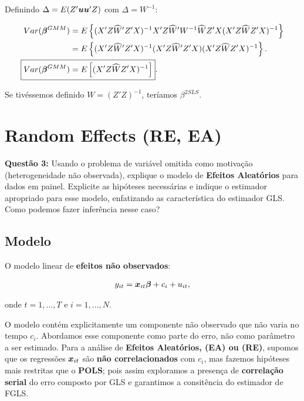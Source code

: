 \documentclass[11pt,oneside,a4paper]{article}
\numberwithin{equation}{section}
\begin{document}
\noindent
Definindo $\Delta = E(Z' \boldsymbol{u}\boldsymbol{u}' Z)$ com $\Delta = W^{-1}$:

\vspace{-1 em}
\begin{align*}
Var( \mbs{\beta}^{GMM} ) &=
E \left\{ 
( X' Z \widehat{W}' Z' X )^{-1}
X' Z \widehat{W}' W^{-1} \widehat{W} Z' X 
( X' Z \widehat{W} Z' X )^{-1}
\right\}
\\ &=
E \left\{ 
( X' Z \widehat{W}' Z' X )^{-1}
( X' Z \widehat{W}' Z' X )
( X' Z \widehat{W} Z' X )^{-1}
\right\}.
\\
\Aboxed{
Var( \mbs{\beta}^{GMM} ) &=
E \left[
( X' Z \widehat{W} Z' X )^{-1}
\right] }.
\end{align*}

\noindent
Se tivéssemos definido $W = (Z'Z)^{-1}$, teríamos $\beta^{2SLS}$.

\clearpage
\section{Random Effects (RE, EA)}

\noindent
\textbf{Questão 3:}
Usando o problema de variável omitida como motivação (heterogeneidade não observada), explique o modelo de \textbf{Efeitos Aleatórios} para dados em painel.
Explicite as hipóteses necessárias e indique o estimador apropriado para esse modelo, enfatizando as característica do estimador GLS.
Como podemos fazer inferência nesse caso?

\subsection*{Modelo}

O modelo linear de \textbf{efeitos não observados}:

\vspace{-1 em}
\begin{align} \label{mod1:EA}
	y_{it} = \boldsymbol{x}_{it} \boldsymbol{\beta} + c_{i} + u_{it},
\end{align}

\noindent
onde
$t = 1, \dots, T$ e $i = 1, \dots, N$.

O modelo contém explicitamente um componente não observado que não varia no tempo $c_{i}$.
Abordamos esse componente como parte do erro, não como parâmetro a ser estimado.
Para a análise de \textbf{Efeitos Aleatórios, (EA) ou (RE)}, supomos que os regressões $\boldsymbol{x}_{it}$ são \textbf{não correlacionados} com $c_{i}$, mas fazemos hipóteses mais restritas que o \textbf{POLS}; pois assim exploramos a presença de \textbf{correlação serial} do erro composto por GLS e garantimos a consitência do estimador de FGLS.
\end{document}
